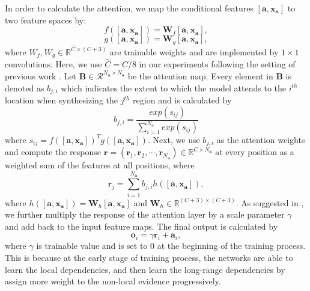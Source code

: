 In order to calculate the attention, we map the conditional features $[\bm{a}, \bm{x}_{\bm{a}}]$ to two feature spaces by:
\begin{equation}
\label{eqn:f}
f([\bm{a}, \bm{x}_{\bm{a}} ])=\mathbf{W}_f[\bm{a}, \bm{x}_{\bm{a}} ],
\end{equation}
\begin{equation}
\label{eqn:g}
g([\bm{a}, \bm{x}_{\bm{a}} ])=\mathbf{W}_g[\bm{a}, \bm{x}_{\bm{a}} ],
\end{equation}
where $W_f, W_g\in \mathbb{R}^{\hat{C}\times (C+3)}$ are trainable weights and are implemented by $1\times 1$ convolutions. Here, we use $\hat{C}=C/8$ in our experiments following the setting of previous work \cite{SAGANs}.
%
Let $\mathbf{B}\in \mathcal{R}^{N_{\bm{a}}\times N_{\bm{a}}}$ be the attention map. Every element in $\mathbf{B}$ is denoted as $b_{j,i}$ which indicates the extent to which the model attends to the $i^{th}$ location when synthesizing the $j^{th}$ region and is calculated by 
\begin{equation}
\label{eqn:beta}
b_{j,i}=\frac{exp(s_{ij})}{\sum^{N_a}_{i=1}exp(s_{ij})}
\end{equation}
where $s_{ij}=f([\bm{a}, \bm{x}_{\bm{a}} ])^Tg([\bm{a}, \bm{x}_{\bm{a}} ])$. Next, we use $b_{j,i}$ as the attention weights and compute the response $\bm{r}=(\bm{r}_1, \bm{r}_2,\cdots, \bm{r}_{N_{\bm{a}}})\in \mathbb{R}^{C\times N_{\bm{a}}}$ at every position as a weighted sum of the features at all positions, where
\begin{equation}
\label{eqn:response}
\bm{r}_j=\sum^{N_{\bm{a}}}_{i=1}b_{j,i}h([\bm{a}, \bm{x}_{\bm{a}} ]),
\end{equation}
where $h([\bm{a}, \bm{x}_{\bm{a}}])=\mathbf{W}_h[\bm{a}, \bm{x}_{\bm{a}} ]$ and $\mathbf{W}_h\in \mathbb{R}^{(C+3)\times (C+3)}$.
As suggested in \cite{SAGANs}, we further multiply the response of the attention layer by a scale parameter $\gamma$ and add back to the input feature maps. The final output is calculated by 
\begin{equation}
\label{eqn:output}
\bm{o}_i=\gamma \bm{r}_i+\bm{a}_i,
\end{equation}
where $\gamma$ is trainable value and is set to $0$ at the beginning of the training process. This is because at the early stage of training process, the networks are able to learn the local dependencies, and then learn the long-range dependencies by assign more weight to the non-local evidence progressively.
%
%

